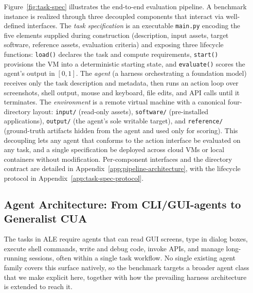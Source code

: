 Figure~\ref{fig:task-spec} illustrates the end-to-end evaluation pipeline. A benchmark instance is realized through three decoupled components that interact via well-defined interfaces. The \textit{task specification} is an executable \texttt{main.py} encoding the five elements supplied during construction (description, input assets, target software, reference assets, evaluation criteria) and exposing three lifecycle functions: \texttt{load()} declares the task and compute requirements, \texttt{start()} provisions the VM into a deterministic starting state, and \texttt{evaluate()} scores the agent's output in $[0, 1]$. The \textit{agent} (a harness orchestrating a foundation model) receives only the task description and metadata, then runs an action loop over screenshots, shell output, mouse and keyboard, file edits, and API calls until it terminates. The \textit{environment} is a remote virtual machine with a canonical four-directory layout: \texttt{input/} (read-only assets), \texttt{software/} (pre-installed applications), \texttt{output/} (the agent's sole writable target), and \texttt{reference/} (ground-truth artifacts hidden from the agent and used only for scoring). This decoupling lets any agent that conforms to the action interface be evaluated on any task, and a single specification be deployed across cloud VMs or local containers without modification. Per-component interfaces and the directory contract are detailed in Appendix~\ref{app:pipeline-architecture}, with the lifecycle protocol in Appendix~\ref{app:task-spec-protocol}.

\vspace{-0.4em}
\subsection{Agent Architecture: From CLI/GUI-agents to Generalist CUA}
\label{sec:agent-architecture}
\vspace{-0.4em}
The tasks in ALE require agents that can read GUI screens, type in dialog boxes, execute shell commands, write and debug code, invoke APIs, and manage long-running sessions, often within a single task workflow. No single existing agent family covers this surface natively, so the benchmark targets a broader agent class that we make explicit here, together with how the prevailing harness architecture is extended to reach it.

